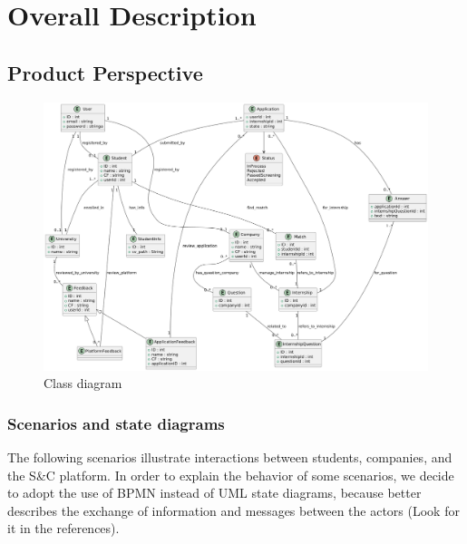 \section{Overall Description}
\subsection{Product Perspective}

\begin{figure}[!ht]
    \centering
    \includegraphics[scale=0.47]{Images/ImagesRASD/class_diagram.png}
    \caption{Class diagram}
\end{figure}

\subsubsection{Scenarios and state diagrams}
The following scenarios illustrate interactions between students, companies, and the S\&C platform.
In order to explain the behavior of some scenarios, we decide to adopt the use of BPMN instead of UML state diagrams, because better describes the exchange of information and messages between the actors (Look for it in the references).

